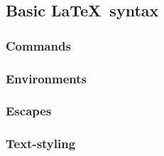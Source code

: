 \subsection{Basic \LaTeX\ syntax}
\subsubsection*{Commands}
\subsubsection*{Environments}
\subsubsection*{Escapes}
\subsubsection*{Text-styling}

\subsubsection*{}
